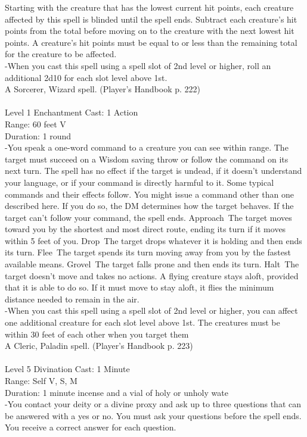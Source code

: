 \documentclass[10pt,twocolumn]{report}
\begin{document}
Starting with the creature that has the lowest current hit points, each creature affected by this spell is blinded until the spell ends. Subtract each creature’s hit points from the total before moving on to the creature with the next lowest hit points. A creature’s hit points must be equal to or less than the remaining total for the creature to be affected.\\
-When you cast this spell using a spell slot of 2nd level or higher, roll an additional 2d10 for each slot level above 1st.\\
A Sorcerer, Wizard spell. (Player's Handbook p. 222) \\


 \\
Level 1 \quad Enchantment \quad Cast: 1 Action\\
Range: 60 feet \quad V\\
Duration: 1 round \quad \\
-You speak a one-word command to a creature you can see within range. 
The target must succeed on a Wisdom saving throw or follow the command on its next turn. The spell has no effect if the target is undead, if it doesn’t understand your language, or if your command is directly harmful to it.  Some typical commands and their effects follow. You might issue a command other than one described here. If you do so, the DM determines how the target behaves. If the target can’t follow your command, the spell ends.
Approach The target moves toward you by the shortest and most direct route, ending its turn if it moves within 5 feet of you.
Drop The target drops whatever it is holding and then ends its turn.
Flee The target spends its turn moving away from you by the fastest available means.
Grovel The target falls prone and then ends its turn.
Halt The target doesn’t move and takes no actions. A flying creature stays aloft, provided that it is able to do so. If it must move to stay aloft, it flies the minimum distance needed to remain in the air.\\
-When you cast this spell using a spell slot of 2nd level or higher, you can affect one additional creature for each slot level above 1st. The creatures must be within 30 feet of each other when you target them\\
A Cleric, Paladin spell. (Player's Handbook p. 223) \\


 \\
Level 5 \quad Divination \quad Cast: 1 Minute\\
Range: Self \quad V, S, M\\
Duration: 1 minute \quad incense and a vial of holy or unholy wate\\
-You contact your deity or a divine proxy and ask up to three questions that can be answered with a yes or no. You must ask your questions before the spell ends. You receive a correct answer for each question. 
\end{document}
